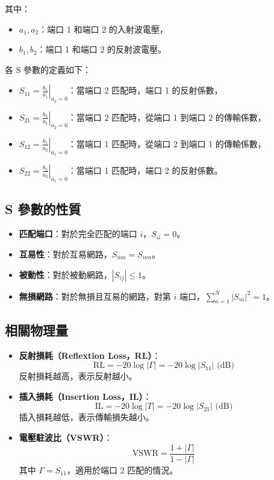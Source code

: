 \documentclass[ paper=a4paper, 12pt]{article}
\begin{document}
其中：
\begin{itemize}
\item \(a_1, a_2\)：端口 1 和端口 2 的入射波電壓，
\item \(b_1, b_2\)：端口 1 和端口 2 的反射波電壓。

\end{itemize}

各 S 參數的定義如下：
\begin{itemize}
\item \(S_{11} = \left. \frac{b_1}{a_1} \right|_{a_2=0}\)：當端口 2 匹配時，端口 1 的反射係數，
\item \(S_{21} = \left. \frac{b_2}{a_1} \right|_{a_2=0}\)：當端口 2 匹配時，從端口 1 到端口 2 的傳輸係數，
\item \(S_{12} = \left. \frac{b_1}{a_2} \right|_{a_1=0}\)：當端口 1 匹配時，從端口 2 到端口 1 的傳輸係數，
\item \(S_{22} = \left. \frac{b_2}{a_2} \right|_{a_1=0}\)：當端口 1 匹配時，端口 2 的反射係數。

\end{itemize}

\subsection{S 參數的性質}
\begin{itemize}
\item \textbf{匹配端口}：對於完全匹配的端口 \(i\)，\(S_{ii} = 0\)。
\item \textbf{互易性}：對於互易網路，\(S_{nm} = S_{mn}\)。
\item \textbf{被動性}：對於被動網路，\(|S_{ij}| \leq 1\)。
\item \textbf{無損網路}：對於無損且互易的網路，對第 \(i\) 端口，\(\sum_{n=1}^N |S_{ni}|^2 = 1\)。

\end{itemize}

\subsection{相關物理量}
\begin{itemize}
\item \textbf{反射損耗（Reflextion Loss，RL）}：
\[
\text{RL} = -20 \log |\Gamma| = -20 \log |S_{11}| \text{ (dB)}
\]
反射損耗越高，表示反射越小。
\item \textbf{插入損耗（Insertion Loss，IL）}：
\[
\text{IL} = -20 \log |T| = -20 \log |S_{21}| \text{ (dB)}
\]
插入損耗越低，表示傳輸損失越小。
\item \textbf{電壓駐波比（VSWR）}：
\[
\text{VSWR} = \frac{1 + |\Gamma|}{1 - |\Gamma|}
\]
其中 \(\Gamma = S_{11}\)，適用於端口 2 匹配的情況。
\end{itemize}
\end{document}
